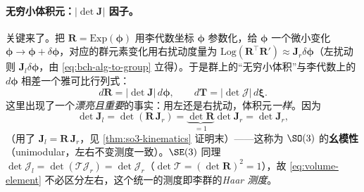 \paragraph{无穷小体积元：$|\det\mathbf{J}|$ 因子。}关键来了。把 $\mathbf{R}=\mathrm{Exp}(\boldsymbol{\phi})$ 用李代数坐标 $\boldsymbol{\phi}$ 参数化，给 $\boldsymbol{\phi}$ 一个微小变化 $\boldsymbol{\phi}\to\boldsymbol{\phi}+\delta\boldsymbol{\phi}$，对应的群元素变化用右扰动度量为 $\mathrm{Log}(\mathbf{R}^\top\mathbf{R}')\approx\mathbf{J}_r\delta\boldsymbol{\phi}$（左扰动则 $\mathbf{J}_l\delta\boldsymbol{\phi}$，由 \cref{eq:bch-alg-to-group} 立得）。于是群上的“无穷小体积”与李代数上的 $d\boldsymbol{\phi}$ 相差一个雅可比行列式：
\begin{equation}
  d\mathbf{R}=|\det\mathbf{J}|\,d\boldsymbol{\phi},\qquad
  d\mathbf{T}=|\det\boldsymbol{\mathcal{J}}|\,d\boldsymbol{\xi}.
  \label{eq:volume-element}
\end{equation}
这里出现了一个\emph{漂亮且重要}的事实：用左还是右扰动，体积元\emph{一样}。因为
\begin{equation}
  \det\mathbf{J}_l=\det(\mathbf{R}\,\mathbf{J}_r)=\underbrace{\det\mathbf{R}}_{=1}\det\mathbf{J}_r=\det\mathbf{J}_r,
  \label{eq:unimodular}
\end{equation}
（用了 $\mathbf{J}_l=\mathbf{R}\,\mathbf{J}_r$，见 \cref{thm:so3-kinematics} 证明末）——这称为 $\SO(3)$ 的\textbf{幺模性}（unimodular，左右不变测度一致）。$\SE(3)$ 同理 $\det\boldsymbol{\mathcal{J}}_l=\det(\boldsymbol{\mathcal{T}}\boldsymbol{\mathcal{J}}_r)=\det\boldsymbol{\mathcal{J}}_r$（$\det\boldsymbol{\mathcal{T}}=(\det\mathbf{R})^2=1$），故 \cref{eq:volume-element} 不必区分左右，这个统一的测度即李群的\emph{Haar 测度}。

